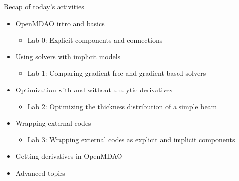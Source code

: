 \documentclass[aspectratio=169, usenames,dvipsnames, 14pt]{beamer}
\begin{document}
\begin{frame}{Recap of today's activities}
	\begin{itemize}
		\item OpenMDAO intro and basics
			\begin{itemize}
				\item Lab 0: Explicit components and connections
			\end{itemize}
		\item Using solvers with implicit models
			\begin{itemize}
				\item Lab 1: Comparing gradient-free and gradient-based solvers
			\end{itemize}
		\item Optimization with and without analytic derivatives
			\begin{itemize}
				\item Lab 2: Optimizing the thickness distribution of a simple beam
			\end{itemize}
		\item Wrapping external codes
			\begin{itemize}
				\item Lab 3: Wrapping external codes as explicit and implicit components
			\end{itemize}
		\item Getting derivatives in OpenMDAO
		\item Advanced topics
	\end{itemize}
\end{frame}
\end{document}
